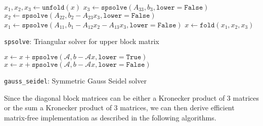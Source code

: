 \begin{algorithm}[H]
\DontPrintSemicolon
\SetAlgoLined
{}
\BlankLine

  $x_1, x_2, x_3 \gets \texttt{unfold}(x)$ \; 
  $x_3 \gets \texttt{spsolve}(A_{33}, b_3, \texttt{lower}=\texttt{False})$                                    
  $x_2 \gets \texttt{spsolve}(A_{22}, b_2 - A_{23} x_3, \texttt{lower}=\texttt{False})$                       
  $x_1 \gets \texttt{spsolve}(A_{11}, b_1 - A_{12} x_2 - A_{13} x_3, \texttt{lower}=\texttt{False})$          
  $x \gets \texttt{fold}(x_1, x_2, x_3)$ \; 

\caption{\texttt{spsolve}: Triangular solver for upper block matrix}
\end{algorithm} 

\begin{algorithm}[H]
\DontPrintSemicolon
\SetAlgoLined
{}
\BlankLine

   {
    $x \gets x + \texttt{spsolve}(\mathcal{A}, b - \mathcal{A} x, \texttt{lower}=\texttt{True})$ \; 
  }
   {
    $x \gets x + \texttt{spsolve}(\mathcal{A}, b - \mathcal{A} x, \texttt{lower}=\texttt{False})$ \; 
  }

\caption{\texttt{gauss\_seidel}: Symmetric Gauss Seidel solver}
\end{algorithm} 

Since the diagonal block matrices can be either a Kronecker product of 3 matrices or the sum a Kronecker product of 3 matrices, we can then derive efficient matrix-free implementation as described in the following algorithms.

